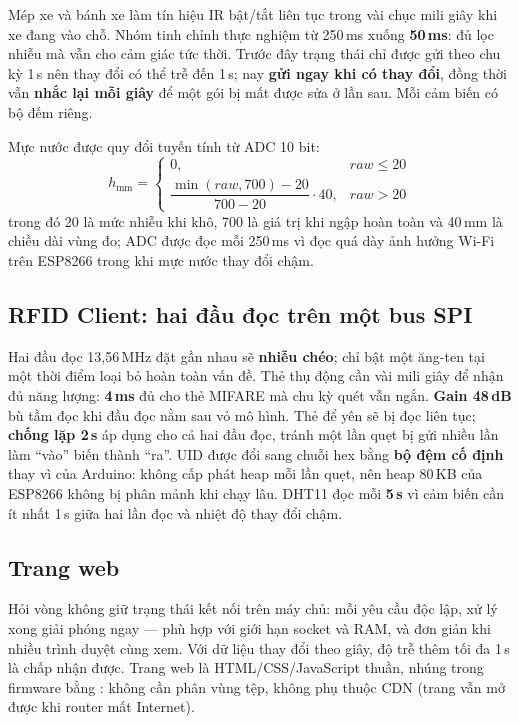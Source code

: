\begin{lydo}
Mép xe và bánh xe làm tín hiệu IR bật/tắt liên tục trong vài chục mili giây khi xe
đang vào chỗ. Nhóm tinh chỉnh thực nghiệm từ 250\,ms xuống \textbf{50\,ms}: đủ lọc nhiễu
mà vẫn cho cảm giác tức thời. Trước đây trạng thái chỉ được gửi theo chu kỳ 1\,s nên thay đổi
có thể trễ đến 1\,s; nay \textbf{gửi ngay khi có thay đổi}, đồng thời vẫn \textbf{nhắc
lại mỗi giây} để một gói bị mất được sửa ở lần sau. Mỗi cảm biến có bộ đếm riêng.
\end{lydo}

Mực nước được quy đổi tuyến tính từ ADC 10 bit:
\begin{equation}
  h_{\text{mm}} =
  \begin{cases}
  0, & raw \le 20 \\[2pt]
  \dfrac{\min(raw, 700) - 20}{700 - 20} \cdot 40, & raw > 20
  \end{cases}
\end{equation}
trong đó 20 là mức nhiễu khi khô, 700 là giá trị khi ngập hoàn toàn và 40\,mm là
chiều dài vùng đo; ADC được đọc mỗi 250\,ms vì đọc quá dày ảnh hưởng Wi-Fi trên
ESP8266 trong khi mực nước thay đổi chậm.

\subsection{RFID Client: hai đầu đọc trên một bus SPI}
\begin{lydo}
Hai đầu đọc 13,56\,MHz đặt gần nhau sẽ \textbf{nhiễu chéo}; chỉ bật một ăng-ten tại
một thời điểm loại bỏ hoàn toàn vấn đề. Thẻ thụ động cần vài mili giây để nhận đủ năng
lượng: \textbf{4\,ms} đủ cho thẻ MIFARE mà chu kỳ quét vẫn ngắn. \textbf{Gain 48\,dB} bù
tầm đọc khi đầu đọc nằm sau vỏ mô hình. Thẻ để yên sẽ bị đọc liên tục; \textbf{chống
lặp 2\,s} áp dụng cho cả hai đầu đọc, tránh một lần quẹt bị gửi nhiều lần làm ``vào''
biến thành ``ra''. UID được đổi sang chuỗi hex bằng \textbf{bộ đệm cố định} thay vì
 của Arduino: không cấp phát heap mỗi lần quẹt, nên heap 80\,KB của
ESP8266 không bị phân mảnh khi chạy lâu. DHT11 đọc mỗi \textbf{5\,s} vì cảm biến cần ít
nhất 1\,s giữa hai lần đọc và nhiệt độ thay đổi chậm.
\end{lydo}

\subsection{Trang web}
\begin{lydo}
Hỏi vòng không giữ trạng thái kết nối trên máy chủ: mỗi yêu cầu độc lập, xử lý xong
giải phóng ngay — phù hợp với giới hạn socket và RAM, và đơn giản khi nhiều trình duyệt
cùng xem. Với dữ liệu thay đổi theo giây, độ trễ thêm tối đa 1\,s là chấp nhận được.
Trang web là HTML/CSS/JavaScript thuần, nhúng trong firmware bằng
: không cần phân vùng tệp, không phụ thuộc CDN (trang vẫn mở được
khi router mất Internet).
\end{lydo}

